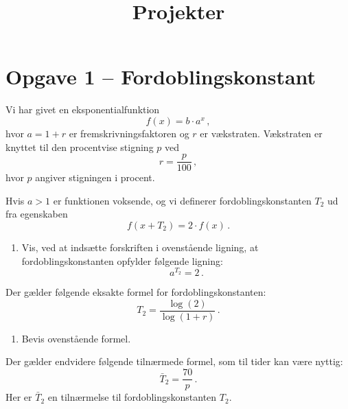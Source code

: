 \documentclass[12pt,oneside,a4paper]{article}
\title{Projekter}
\date{\vspace{-5ex}}
\theoremstyle{plain}
\begin{document}
\maketitle

\section*{Opgave 1 -- Fordoblingskonstant}
Vi har givet en eksponentialfunktion
\[
    f(x) = b\cdot a^x\,,
\]
hvor $a=1+r$ er fremskrivningsfaktoren og $r$ er vækstraten.
Vækstraten er knyttet til den procentvise stigning $p$ ved
\[
    r = \frac{p}{100}\,,
\]
hvor $p$ angiver stigningen i procent.

Hvis $a>1$ er funktionen voksende, og vi definerer fordoblingskonstanten
$T_2$ ud fra egenskaben
\[
    f(x+T_2) = 2\cdot f(x)\,.
\]

\begin{enumerate}[label=(\alph*)]
    \item Vis, ved at indsætte forskriften i ovenstående ligning, at 
fordoblingskonstanten opfylder følgende ligning:
\[
    a^{T_2} = 2\,.
\]
\end{enumerate}

Der gælder følgende eksakte formel for fordoblingskonstanten:
\[
    T_2 = \frac{\log(2)}{\log(1+r)}\,.
\]
\begin{enumerate}[label=(\alph*), resume]
    \item Bevis ovenstående formel.
\end{enumerate}

Der gælder endvidere følgende tilnærmede formel, som til tider kan være nyttig:
\[
    \bar T_2 = \frac{70}{p} \,.
\]
Her er $\bar T_2$ en tilnærmelse til fordoblingskonstanten $T_2$.
\end{document}
